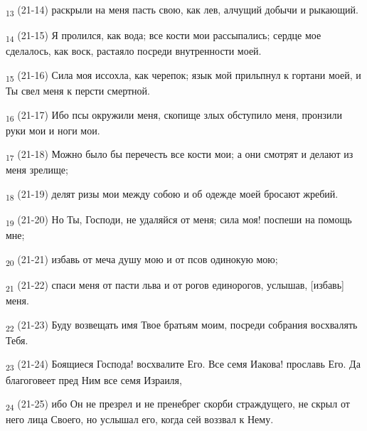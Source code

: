 \begin{tcolorbox}
\textsubscript{13} (21-14) раскрыли на меня пасть свою, как лев, алчущий добычи и рыкающий.
\end{tcolorbox}
\begin{tcolorbox}
\textsubscript{14} (21-15) Я пролился, как вода; все кости мои рассыпались; сердце мое сделалось, как воск, растаяло посреди внутренности моей.
\end{tcolorbox}
\begin{tcolorbox}
\textsubscript{15} (21-16) Сила моя иссохла, как черепок; язык мой прильпнул к гортани моей, и Ты свел меня к персти смертной.
\end{tcolorbox}
\begin{tcolorbox}
\textsubscript{16} (21-17) Ибо псы окружили меня, скопище злых обступило меня, пронзили руки мои и ноги мои.
\end{tcolorbox}
\begin{tcolorbox}
\textsubscript{17} (21-18) Можно было бы перечесть все кости мои; а они смотрят и делают из меня зрелище;
\end{tcolorbox}
\begin{tcolorbox}
\textsubscript{18} (21-19) делят ризы мои между собою и об одежде моей бросают жребий.
\end{tcolorbox}
\begin{tcolorbox}
\textsubscript{19} (21-20) Но Ты, Господи, не удаляйся от меня; сила моя! поспеши на помощь мне;
\end{tcolorbox}
\begin{tcolorbox}
\textsubscript{20} (21-21) избавь от меча душу мою и от псов одинокую мою;
\end{tcolorbox}
\begin{tcolorbox}
\textsubscript{21} (21-22) спаси меня от пасти льва и от рогов единорогов, услышав, [избавь] меня.
\end{tcolorbox}
\begin{tcolorbox}
\textsubscript{22} (21-23) Буду возвещать имя Твое братьям моим, посреди собрания восхвалять Тебя.
\end{tcolorbox}
\begin{tcolorbox}
\textsubscript{23} (21-24) Боящиеся Господа! восхвалите Его. Все семя Иакова! прославь Его. Да благоговеет пред Ним все семя Израиля,
\end{tcolorbox}
\begin{tcolorbox}
\textsubscript{24} (21-25) ибо Он не презрел и не пренебрег скорби страждущего, не скрыл от него лица Своего, но услышал его, когда сей воззвал к Нему.
\end{tcolorbox}
